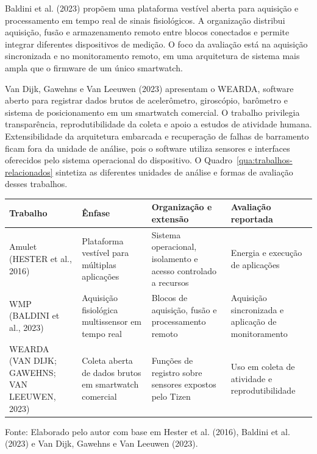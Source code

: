 \documentclass[a4paper,12pt]{article}
\newcommand{\fonteelemento}[1]{%
  \par\smallskip
  {\fontsize{10}{12}\selectfont\raggedright Fonte: #1.\par}%
}
\begin{document}
Baldini et al. (2023) prop\~oem uma plataforma vest\'ivel aberta para aquisi\c{c}\~ao e processamento em tempo real de sinais fisiol\'ogicos. A organiza\c{c}\~ao distribui aquisi\c{c}\~ao, fus\~ao e armazenamento remoto entre blocos conectados e permite integrar diferentes dispositivos de medi\c{c}\~ao. O foco da avalia\c{c}\~ao est\'a na aquisi\c{c}\~ao sincronizada e no monitoramento remoto, em uma arquitetura de sistema mais ampla que o firmware de um \'unico smartwatch.


Van Dijk, Gawehns e Van Leeuwen (2023) apresentam o WEARDA, software aberto para registrar dados brutos de aceler\^ometro, girosc\'opio, bar\^ometro e sistema de posicionamento em um smartwatch comercial. O trabalho privilegia transpar\^encia, reprodutibilidade da coleta e apoio a estudos de atividade humana. Extensibilidade da arquitetura embarcada e recupera\c{c}\~ao de falhas de barramento ficam fora da unidade de an\'alise, pois o software utiliza sensores e interfaces oferecidos pelo sistema operacional do dispositivo. O Quadro~\ref{qua:trabalhos-relacionados} sintetiza as diferentes unidades de an\'alise e formas de avalia\c{c}\~ao desses trabalhos.


\begin{quadro}[ht]
\centering
\caption{Compara\c{c}\~ao entre plataformas vest\'iveis relacionadas}
\label{qua:trabalhos-relacionados}
\small
\renewcommand{\arraystretch}{1.15}
\begin{tabularx}{\textwidth}{>{\raggedright\arraybackslash}p{}*{3}{>{\raggedright\arraybackslash}X}}
\toprule
\textbf{Trabalho} & \textbf{\^Enfase} & \textbf{Organiza\c{c}\~ao e extens\~ao} & \textbf{Avalia\c{c}\~ao reportada} \\
\midrule
Amulet (HESTER et al., 2016) & Plataforma vest\'ivel para m\'ultiplas aplica\c{c}\~oes & Sistema operacional, isolamento e acesso controlado a recursos & Energia e execu\c{c}\~ao de aplica\c{c}\~oes \\
\addlinespace
WMP (BALDINI et al., 2023) & Aquisi\c{c}\~ao fisiol\'ogica multissensor em tempo real & Blocos de aquisi\c{c}\~ao, fus\~ao e processamento remoto & Aquisi\c{c}\~ao sincronizada e aplica\c{c}\~ao de monitoramento \\
\addlinespace
WEARDA (VAN DIJK; GAWEHNS; VAN LEEUWEN, 2023) & Coleta aberta de dados brutos em smartwatch comercial & Fun\c{c}\~oes de registro sobre sensores expostos pelo Tizen & Uso em coleta de atividade e reprodutibilidade \\
\bottomrule
\end{tabularx}
\fonteelemento{Elaborado pelo autor com base em Hester et al. (2016), Baldini et al. (2023) e Van Dijk, Gawehns e Van Leeuwen (2023)}
\end{quadro}
\end{document}
